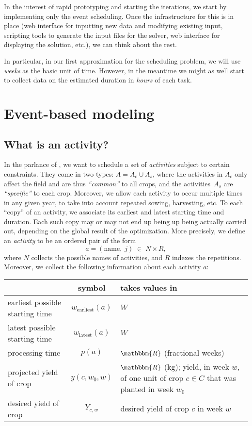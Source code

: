 \documentclass[11pt,reqno]{amsart}
\newcommand{\RR}{\mathbbm{R}}
\numberwithin{equation}{section}
\begin{document}
In the interest of rapid prototyping and starting the iterations, we start by implementing
only the event scheduling. Once the infrastructure for this is in place (web interface for
inputting new data and modifying existing input, scripting tools to generate the input
files for the solver, web interface for displaying the solution, etc.), we can think about
the rest.

In particular, in our first approximation for the scheduling problem, we will use
\emph{weeks} as the basic unit of time. However, in the meantime we might as well start to
collect data on the estimated duration in \emph{hours} of each task.


\section{Event-based modeling}


\subsection{What is an activity?}

In the parlance of \cite{artigues-etal11}, we want to schedule a set
of \emph{activities} subject to certain constraints. 
%
%
They come in two types: $A=A_c\cup A_s$, where the activities in $A_c$ only affect the
field and are thus \emph{``common''} to all crops, and the activities~$A_s$ are
\emph{``specific''} to each crop. Moreover, we allow each activity to occur multiple times
in any given year, to take into account repeated sowing, harvesting, etc. To each ``copy''
of an activity, we associate its earliest and latest starting time and duration. Each such
copy may or may not end up being up being actually carried out, depending on the global
result of the optimization.  More precisely, we define an \emph{activity} to be an ordered
pair of the form
\[
  a = (\text{name}, \; j) \;\in\;
  N\times R,
\]
where $N$ collects the possible names of activities, and $R$ indexes the
repetitions. Moreover, we collect the following information about each activity $a$:
\begin{center}
  \begin{tabular}{lcp{8cm}}
    & symbol & takes values in\\\hline 
    earliest possible starting time & $w_{\text{earliest}}(a)$ & $W$ \\ 
    latest possible starting time & $w_{\text{latest}}(a)$ & $W$ \\ 
    processing time & $p(a)$ & $\RR$ (fractional weeks)\\ 
    projected yield of crop & $y(c,w_0,w)$ & $\RR$ (kg); yield, in week $w$, of one unit of crop $c\in C$ that was planted in week $w_0$\\
    desired yield of crop & $Y_{c,w}$ & desired yield of crop $c$ in week $w$\\\hline
  \end{tabular}
\end{center}
\end{document}
